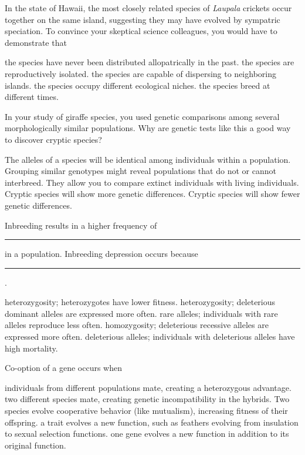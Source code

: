 
\question
In the state of Hawaii, the most closely related species of \textit{Laupala} crickets occur together on the same island, suggesting they may have evolved by sympatric speciation.  To convince your skeptical science colleagues, you would have to demonstrate that

\begin{choices}
\correctchoice the species have never been distributed allopatrically in the past. 
\choice the species are reproductively isolated. 
\choice the species are capable of dispersing to neighboring islands. 
\choice the species occupy different ecological niches. 
\choice the species breed at different times. 
\end{choices}

\question
In your study of giraffe species, you used genetic comparisons among several morphologically similar populations. Why are genetic tests like this a good way to discover cryptic species?

\begin{choices}
\choice The alleles of a species will be identical among individuals within a population. 
\correctchoice Grouping similar genotypes might reveal populations that do not or cannot interbreed. 
\choice They allow you to compare extinct individuals with living individuals. 
\choice Cryptic species will show more genetic differences. 
\choice Cryptic species will show fewer genetic differences. 
\end{choices}

\question
Inbreeding results in a higher frequency of \rule{1in}{0.4pt} in a population.  Inbreeding depression occurs because \rule{1in}{0.4pt}.

\begin{choices}
\choice heterozygosity; heterozygotes have lower fitness. 
\choice heterozygosity; deleterious dominant alleles are expressed more often. 
\choice rare alleles; individuals with rare alleles reproduce less often. 
\correctchoice homozygosity; deleterious recessive alleles are expressed more often. 
\choice deleterious alleles; individuals with deleterious alleles have high mortality. 
\end{choices}

\question
Co-option of a gene occurs when

\begin{choices}
\choice individuals from different populations mate, creating a heterozygous advantage. 
\choice two different species mate, creating genetic incompatibility in the hybrids. 
\choice Two species evolve cooperative behavior (like mutualism), increasing fitness of their offspring. 
\choice a trait evolves a new function, such as feathers evolving from insulation to sexual selection functions. 
\correctchoice one gene evolves a new function in addition to its original function. 
\end{choices}

